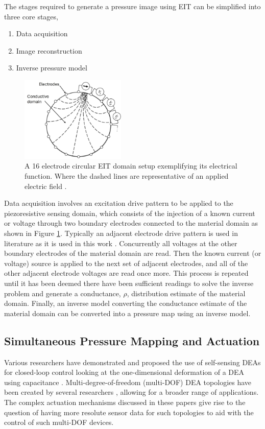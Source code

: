     The stages required to generate a pressure image using EIT can be simplified into three core stages,
	\begin{enumerate}
		\item Data acquisition
		\item Image reconstruction
		\item Inverse pressure model
	\end{enumerate} 
	\begin{figure}[H]
		\centering
		\includegraphics[width=5cm]{Figures/EIT_diagram_labelled.jpg}
        \vspace{0.2cm}
		\caption{A 16 electrode circular EIT domain setup exemplifying its electrical function. Where the dashed lines are representative of an applied electric field\cite{Ellingham2022} .}
		\label{fig:EIT_diagram}
	\end{figure}
	Data acquisition involves an excitation drive pattern to be applied to the piezoresistive sensing domain, which consists of the injection of a known current or voltage through two boundary electrodes connected to the material domain as shown in Figure \ref{fig:EIT_diagram}. Typically an adjacent electrode drive pattern is used in literature as it is used in this work\cite{Russo2017} . Concurrently all voltages at the other boundary electrodes of the material domain are read. Then the known current (or voltage) source is applied to the next set of adjacent electrodes, and all of the other adjacent electrode voltages are read once more. This process is repeated until it has been deemed there have been sufficient readings to solve the inverse problem and generate a conductance, $\rho$, distribution estimate of the material domain. Finally, an inverse model converting the conductance estimate of the material domain can be converted into a pressure map using an inverse model.
	
	
	\subsection{Simultaneous Pressure Mapping and Actuation}
	\label{subsec:sensing_and_actuation}
	Various researchers have demonstrated and proposed the use of self-sensing DEAs for closed-loop control looking at the one-dimensional deformation of a DEA using capacitance\cite{Gisby2013, Liu2016, Huang2023, Koshiya2023} . Multi-degree-of-freedom (multi-DOF) DEA topologies have been created by several researchers \cite{Nguyen2017, Zhang2024, Zou2023, Pei2004}, allowing for a broader range of applications. The complex actuation mechanisms discussed in these papers give rise to the question of having more resolute sensor data for such topologies to aid with the control of such multi-DOF devices.

